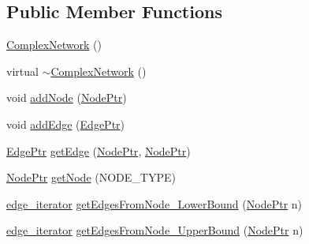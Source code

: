 \subsection*{Public Member Functions}
\begin{DoxyCompactItemize}
\item 
\hyperlink{class_complex_network_a8e33a5505e7a856076cd7d982a165348}{Complex\+Network} ()
\item 
virtual \hyperlink{class_complex_network_a266ec2df18b6408115ebd48f0cee9454}{$\sim$\+Complex\+Network} ()
\item 
void \hyperlink{class_complex_network_a87f2a1b087dc3fc8f6cb53c9bda17180}{add\+Node} (\hyperlink{class_complex_network_a1a0d11ddc5f0c146a0e921b58bb5eb3e}{Node\+Ptr})
\item 
void \hyperlink{class_complex_network_a183168090e8d9446b53643890476b0ba}{add\+Edge} (\hyperlink{class_complex_network_af07ec30729e69a40c4c5ac2e98381206}{Edge\+Ptr})
\item 
\hyperlink{class_complex_network_af07ec30729e69a40c4c5ac2e98381206}{Edge\+Ptr} \hyperlink{class_complex_network_a985d6dc543067794c273f18d87592af4}{get\+Edge} (\hyperlink{class_complex_network_a1a0d11ddc5f0c146a0e921b58bb5eb3e}{Node\+Ptr}, \hyperlink{class_complex_network_a1a0d11ddc5f0c146a0e921b58bb5eb3e}{Node\+Ptr})
\item 
\hyperlink{class_complex_network_a1a0d11ddc5f0c146a0e921b58bb5eb3e}{Node\+Ptr} \hyperlink{class_complex_network_aadc448d5bea09ee87263256f85207ef3}{get\+Node} (N\+O\+D\+E\+\_\+\+T\+Y\+P\+E)
\item 
\hyperlink{class_complex_network_af5db8f579c2622ec27f2cfb6835d8466}{edge\+\_\+iterator} \hyperlink{class_complex_network_a2b10b3b8dd87a9b40413b0aadfa22250}{get\+Edges\+From\+Node\+\_\+\+Lower\+Bound} (\hyperlink{class_complex_network_a1a0d11ddc5f0c146a0e921b58bb5eb3e}{Node\+Ptr} n)
\item 
\hyperlink{class_complex_network_af5db8f579c2622ec27f2cfb6835d8466}{edge\+\_\+iterator} \hyperlink{class_complex_network_a652f0a532b1d174a0423d2e98ea22c10}{get\+Edges\+From\+Node\+\_\+\+Upper\+Bound} (\hyperlink{class_complex_network_a1a0d11ddc5f0c146a0e921b58bb5eb3e}{Node\+Ptr} n)
\end{DoxyCompactItemize}
